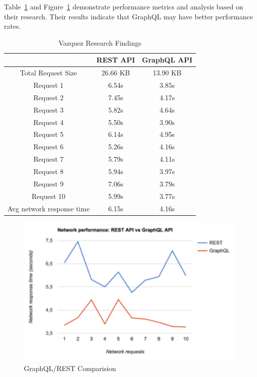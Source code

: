 Table~\ref{T:elements} 
and Figure~\ref{f:comparison-graph}\cite{hid505Vazquez2017} demonstrate 
performance metrics and analysis based on their research.  Their results 
indicate that GraphQL may have better performance rates.

\begin{table}[htb]
  \caption{Vazquez Research Findings}\cite{hid505Vazquez2017}\label{T:elements}
  \bigskip
  \begin{center}
    \begin{tabular}{ c c c }
      & REST API & GraphQL API \\
    \toprule
    Total Request Size & 26.66 KB & 13.90 KB \\
    Request 1 & 6.54s & 3.85s \\
    Request 2 & 7.45s & 4.17s \\
    Request 3 & 5.82s & 4.64s \\
    Request 4 & 5.50s & 3.90s \\
    Request 5 & 6.14s & 4.95s \\
    Request 6 & 5.26s & 4.16s \\
    Request 7 & 5.79s & 4.11s \\
    Request 8 & 5.94s & 3.97s \\
    Request 9 & 7.06s & 3.79s \\
    Request 10 & 5.99s & 3.77s \\
    Avg network response time & 6.15s & 4.16s \\
    \bottomrule
   \end{tabular}
  \end{center}
\end{table}

\begin{figure}[htb]
  \centering\includegraphics[width=\columnwidth]
  {./images/network-response-times-graph.png}
  \caption{GraphQL/REST Comparision}\label{f:comparison-graph}
\end{figure}

